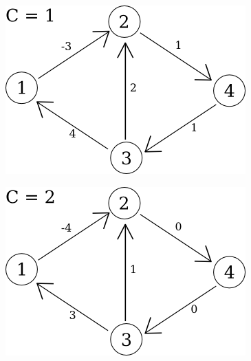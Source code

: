 \begin{figure}[H]
	\centering
	\begin{minipage}[b]{0.45\textwidth}
		\includegraphics[width=\textwidth]{imagenes/problema2/prob2_caso3_c1.png} \\
	\end{minipage}
	\hfill
	\begin{minipage}[b]{0.45\textwidth}
		\includegraphics[width=\textwidth]{imagenes/problema2/prob2_caso3_c2.png} \\
	\end{minipage}
\end{figure}


